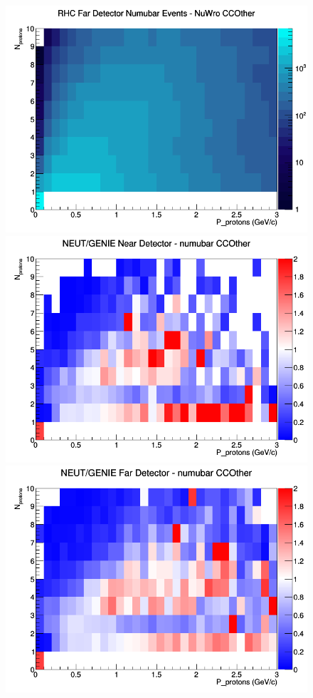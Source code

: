 \documentclass[12pt]{article}
\begin{document}
\begin{figure}[h]
\endminipage
{}
\includegraphics[width=\linewidth]{N_P/nominal/protons/CCOther_RHC_FD_numubar_N_P_NuWro.png}
\endminipage
\newline
{}
\includegraphics[width=\linewidth]{N_P/nominal/protons/ratios/CCOther_NEUT_GENIE_numubar_near_N_P.png}
\endminipage
{}
\includegraphics[width=\linewidth]{N_P/nominal/protons/ratios/CCOther_NEUT_GENIE_numubar_far_N_P.png}

\end{figure}
\end{document}
